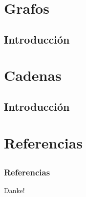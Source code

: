 \documentclass{beamer}
\begin{document}
\section{Grafos}
\subsection{Introducci\'on}

\section{Cadenas}
\subsection{Introducci\'on}

\section{Referencias}
\subsection{}
\begin{frame}[allowframebreaks]
    
    \frametitle{Referencias}
    
    
\end{frame}

\begin{frame}
    \begin{center}
        {\Huge\calligra Danke!}
    \end{center}
\end{frame}
\end{document}
